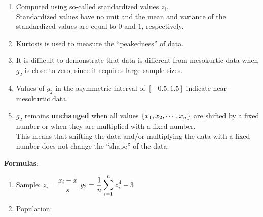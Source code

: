 \begin{enumerate}
    \item Computed using so-called standardized values $z_i$. \hfill \cite{statistics/book/Statistics-for-Data-Scientists/Maurits-Kaptein}\\
    Standardized values have no unit and the mean and variance of the standardized values are equal to $0$ and $1$, respectively. \hfill \cite{statistics/book/Statistics-for-Data-Scientists/Maurits-Kaptein}

    \item Kurtosis is used to measure the “peakedness” of data. \hfill \cite{statistics/book/Statistics-for-Data-Scientists/Maurits-Kaptein}

    \item It is difficult to demonstrate that data is different from mesokurtic data when $g_2$ is close to zero, since it requires large sample sizes. \hfill \cite{statistics/book/Statistics-for-Data-Scientists/Maurits-Kaptein}

    \item Values of $g_2$ in the asymmetric interval of $[-0.5, 1.5]$ indicate near-mesokurtic data. \hfill \cite{statistics/book/Statistics-for-Data-Scientists/Maurits-Kaptein}

    \item $g_2$ remains \textbf{unchanged} when all values $\left\{x_1, x_2, \cdots, x_n\right\}$ are shifted by a fixed number or when they are multiplied with a fixed number. \hfill \cite{statistics/book/Statistics-for-Data-Scientists/Maurits-Kaptein} \\
    This means that shifting the data and/or multiplying the data with a fixed number does not change the “shape” of the data. \hfill \cite{statistics/book/Statistics-for-Data-Scientists/Maurits-Kaptein}
\end{enumerate}


\vspace{0.3cm}
\textbf{Formulas}:
\begin{enumerate}
    \item Sample:
    \label{Data/Describing Data/Central Tendency/Kurtosis/Sample}
    \label{Data/Describing Data/Central Tendency/Kurtosis/z-value}
    \hspace{1cm}  
    $z_i = \dfrac{x_i - \bar{x}}{s}$ 
    \hspace{1cm}
    $g_2 = \dfrac{1}{n} \displaystyle\sum_{i=1}^{n} z_i^4 - 3$
    

    \item Population:
\end{enumerate}


